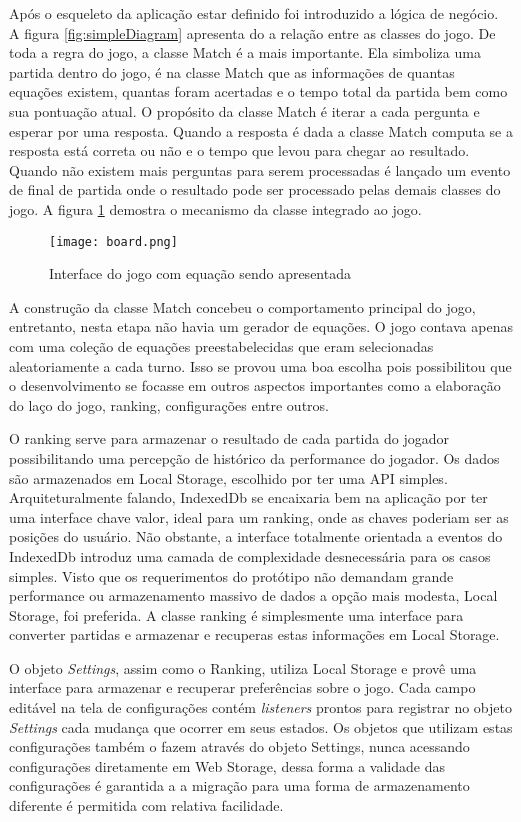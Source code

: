 Após o esqueleto da aplicação estar definido foi introduzido a
lógica de negócio. A figura \ref{fig:simpleDiagram} apresenta do
a relação entre as classes do jogo. De toda a regra do jogo, a
classe Match é a mais importante. Ela simboliza uma partida dentro do
jogo, é na classe Match que as informações de quantas equações
existem, quantas foram acertadas e o tempo total da partida bem como
sua pontuação atual. O propósito da classe Match é iterar a cada
pergunta e esperar por uma resposta. Quando a resposta é dada a classe
Match computa se a resposta está correta ou não e o tempo que levou
para chegar ao resultado. Quando não existem mais perguntas para serem
processadas é lançado um evento de final de partida onde o resultado
pode ser processado pelas demais classes do jogo.
A figura \ref{fig:interface} demostra o mecanismo da classe  integrado
ao jogo.

\begin{figure}
    \centering
    \texttt{[image: board.png]}
	\caption{Interface do jogo com equação sendo apresentada}
    \label{fig:interface}
\end{figure}

A construção da classe Match concebeu o comportamento principal do
jogo, entretanto, nesta etapa não havia um gerador de equações. O
jogo contava apenas com uma coleção de equações preestabelecidas que
eram selecionadas aleatoriamente a cada turno. Isso se provou uma boa
escolha pois possibilitou que o desenvolvimento se focasse em outros
aspectos importantes como a elaboração do laço do jogo, ranking,
configurações entre outros.

O ranking serve para armazenar o resultado de cada partida do jogador
possibilitando uma percepção de histórico da performance do jogador.
Os dados são armazenados em Local Storage, escolhido por ter uma API
simples. Arquiteturalmente falando, IndexedDb se encaixaria bem na
aplicação por ter uma interface chave valor, ideal para um ranking,
onde as chaves poderiam ser as posições do usuário. Não obstante,
a interface totalmente orientada a eventos do IndexedDb introduz uma
camada de complexidade desnecessária para os casos simples. Visto que
os requerimentos do protótipo não demandam grande performance ou
armazenamento massivo de dados a opção mais modesta, Local Storage,
foi preferida. A classe ranking é simplesmente uma interface para
converter partidas e armazenar e recuperas estas informações em Local
Storage.

O objeto \textit{Settings}, assim como o Ranking, utiliza Local Storage
e provê uma interface para armazenar e recuperar preferências sobre
o jogo. Cada campo editável na tela de configurações contém
\textit{listeners} prontos para registrar no objeto \textit{Settings}
cada mudança que ocorrer em seus estados. Os objetos que utilizam estas
configurações também o fazem através do objeto Settings, nunca
acessando configurações diretamente em Web Storage, dessa forma a
validade das configurações é garantida a a migração para uma forma
de armazenamento diferente é permitida com relativa facilidade.

